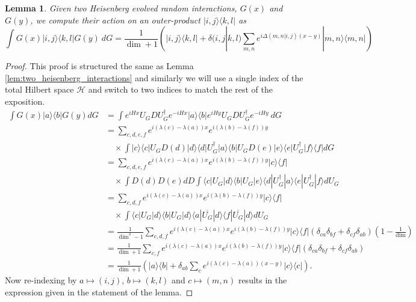 \documentclass{article}
\newtheorem{lemma}[theorem]{Lemma}
\newcommand{\ket}[1]{|#1\rangle}
\newcommand{\bra}[1]{\langle #1|}
\newcommand{\ketbra}[2]{| #1\rangle\! \langle #2|}
\newcommand{\parens}[1]{\left( #1 \right)}
\newcommand{\hilb}{\mathcal{H}}
\begin{document}
\begin{lemma} \label{lem:sandwiched_interaction}
    Given two Heisenberg evolved random interactions, $G(x)$ and $G(y)$, we compute their action on an outer-product $\ketbra{i,j}{k,l}$ as
    \begin{equation}
        \int G(x) \ketbra{i,j}{k,l} G(y) ~dG = \frac{1}{\dim + 1} \parens{\ketbra{i,j}{k,l} + \delta(i,j|k,l) \sum_{m,n} e^{i \Delta(m,n | i,j) (x-y)} \ketbra{m,n}{m,n}}
    \end{equation}
\end{lemma}
\begin{proof}
This proof is structured the same as Lemma \ref{lem:two_heisenberg_interactions} and similarly we will use a single index of the total Hilbert space $\hilb$ and switch to two indices to match the rest of the exposition.
    \begin{align}
        \int G(x) \ketbra{a}{b} G(y) dG &=  \int e^{i H x} U_G D U_G^{\dagger} e^{-i H x} \ketbra{a}{b} e^{i H y} U_G D U_G^\dagger e^{-i H y} ~dG \\
        &= \sum_{c, d, e, f} e^{i (\lambda(c) - \lambda(a))x} e^{i (\lambda(b) - \lambda(f))y} \nonumber \\
        &\quad \times \int \ketbra{c}{c} U_G D(d) \ketbra{d}{d} U_G^\dagger \ketbra{a}{b} U_G D(e) \ketbra{e}{e} U_G^\dagger \ketbra{f}{f} dG \\
        &= \sum_{c, d, e, f}  e^{i (\lambda(c) - \lambda(a))x} e^{i (\lambda(b) - \lambda(f))y} \ketbra{c}{f} \nonumber \\
        &\quad \times \int D(d) D(e) dD \int \bra{c} U_G \ket{d} \bra{b} U_G \ket{e} \bra{d} U_G^\dagger \ket{a} \bra{e} U_G^\dagger \ket{f} dU_G \\
        &=  \sum_{c,d,f} e^{i (\lambda(c) - \lambda(a))x} e^{i (\lambda(b) - \lambda(f))y} \ketbra{c}{f} \nonumber \\ 
        &\quad \times \int \bra{c} U_G \ket{d} \bra{b} U_G \ket{d} \bra{a} \overline{U_G} \ket{d} \bra{f} \overline{U_G} \ket{d} dU_G \\
        &= \frac{1}{\dim^2 - 1} \sum_{c,d,f} e^{i (\lambda(c) - \lambda(a))x} e^{i (\lambda(b) - \lambda(f))y} \ketbra{c}{f} (\delta_{ca} \delta_{bf} + \delta_{cf}\delta_{ab})\parens{1 - \frac{1}{\dim}} \\
        &= \frac{1}{\dim + 1} \sum_{c,f} e^{i (\lambda(c) - \lambda(a))x} e^{i (\lambda(b) - \lambda(f))y} \ketbra{c}{f} (\delta_{ca} \delta_{bf} + \delta_{cf}\delta_{ab}) \\
        &= \frac{1}{\dim + 1} \parens{\ketbra{a}{b} + \delta_{ab} \sum_{c} e^{i(\lambda(c) - \lambda(a))(x-y)} \ketbra{c}{c} }.
    \end{align}
    Now re-indexing by $a \mapsto (i,j)$, $b \mapsto (k,l)$ and $c \mapsto (m,n)$ results in the expression given in the statement of the lemma.
\end{proof}
\end{document}
